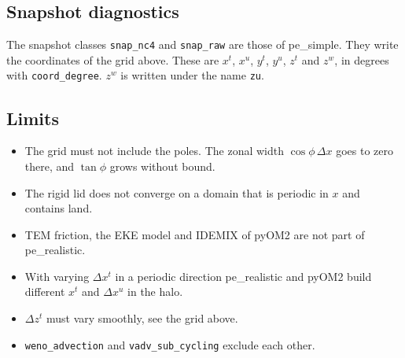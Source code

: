 \documentclass[12pt]{article}
\begin{document}
\subsection*{Snapshot diagnostics}

The snapshot classes \verb|snap_nc4| and \verb|snap_raw| are those of pe\_simple.
They write the coordinates of the grid above.
These are $x^t$, $x^u$, $y^t$, $y^u$, $z^t$ and $z^w$, in degrees with \verb|coord_degree|.
$z^w$ is written under the name \verb|zu|.

\subsection*{Limits}

\begin{itemize}
\item The grid must not include the poles. The zonal width $\cos \phi\, \Delta x$ goes to zero there, and $\tan \phi$ grows without bound.
\item The rigid lid does not converge on a domain that is periodic in $x$ and contains land.
\item TEM friction, the EKE model and IDEMIX of pyOM2 are not part of pe\_realistic.
\item With varying $\Delta x^t$ in a periodic direction pe\_realistic and pyOM2 build different $x^t$ and $\Delta x^u$ in the halo.
\item $\Delta z^t$ must vary smoothly, see the grid above.
\item \verb|weno_advection| and \verb|vadv_sub_cycling| exclude each other.
\end{itemize}
\end{document}
